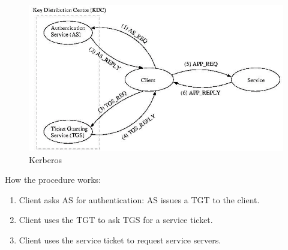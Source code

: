 \begin{figure}
\centering
\includegraphics[width=\textwidth]{img/ch06-kerberos.png}
\caption{Kerberos}
\label{fig:ch06-kerberos}
\end{figure}

How the procedure works:
\begin{enumerate}
    \item Client asks AS for authentication: AS issues a TGT to the client.
    \item Client uses the TGT to ask TGS for a service ticket.
    \item Client uses the service ticket to request service servers.
\end{enumerate}
